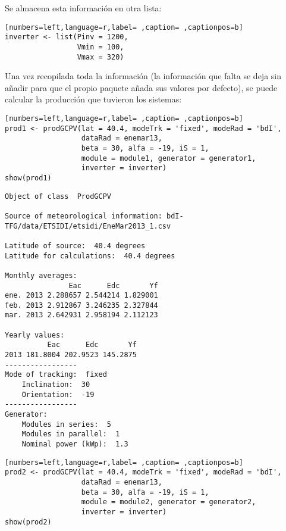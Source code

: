 Se almacena esta información en otra lista:
\begin{lstlisting}[numbers=left,language=r,label= ,caption= ,captionpos=b]
inverter <- list(Pinv = 1200,
                 Vmin = 100,
                 Vmax = 320)
\end{lstlisting}

Una vez recopilada toda la información (la información que falta se deja sin añadir para que el propio paquete añada sus valores por defecto), se puede calcular la producción que tuvieron los sistemas:

\begin{lstlisting}[numbers=left,language=r,label= ,caption= ,captionpos=b]
prod1 <- prodGCPV(lat = 40.4, modeTrk = 'fixed', modeRad = 'bdI',
                  dataRad = enemar13,
                  beta = 30, alfa = -19, iS = 1,
                  module = module1, generator = generator1,
                  inverter = inverter)
show(prod1)
\end{lstlisting}

\begin{verbatim}
Object of class  ProdGCPV 

Source of meteorological information: bdI-TFG/data/ETSIDI/etsidi/EneMar2013_1.csv 

Latitude of source:  40.4 degrees
Latitude for calculations:  40.4 degrees

Monthly averages:
               Eac      Edc       Yf
ene. 2013 2.288657 2.544214 1.829001
feb. 2013 2.912867 3.246235 2.327844
mar. 2013 2.642931 2.958194 2.112123

Yearly values:
          Eac      Edc       Yf
2013 181.8004 202.9523 145.2875
-----------------
Mode of tracking:  fixed 
    Inclination:  30 
    Orientation:  -19 
-----------------
Generator:
    Modules in series:  5 
    Modules in parallel:  1 
    Nominal power (kWp):  1.3
\end{verbatim}

\begin{lstlisting}[numbers=left,language=r,label= ,caption= ,captionpos=b]
prod2 <- prodGCPV(lat = 40.4, modeTrk = 'fixed', modeRad = 'bdI',
                  dataRad = enemar13,
                  beta = 30, alfa = -19, iS = 1,
                  module = module2, generator = generator2,
                  inverter = inverter)
show(prod2)
\end{lstlisting}

